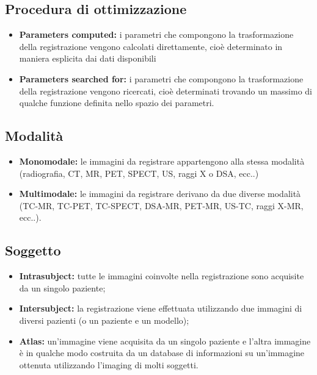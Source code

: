 \subsection{Procedura di ottimizzazione}

\begin{itemize}
    \item \textbf{Parameters computed:} i parametri che compongono la trasformazione della registrazione vengono calcolati direttamente, cioè determinato in maniera esplicita dai dati
          disponibili
    \item \textbf{Parameters searched for:} i parametri che compongono la trasformazione della registrazione vengono ricercati, cioè
          determinati trovando un massimo di qualche funzione definita nello spazio dei parametri.
\end{itemize}

\subsection{Modalità}

\begin{itemize}
    \item \textbf{Monomodale: }le immagini da registrare appartengono alla
          stessa modalità (radiografia, CT, MR, PET, SPECT, US,
          raggi X o DSA, ecc..)
    \item \textbf{Multimodale: }le immagini da registrare derivano da due
          diverse modalità (TC-MR, TC-PET, TC-SPECT, DSA-MR,
          PET-MR, US-TC, raggi X-MR, ecc..).
\end{itemize}

\subsection{Soggetto}

\begin{itemize}
    \item \textbf{Intrasubject: }tutte le immagini coinvolte nella registrazione
          sono acquisite da un singolo paziente;
    \item \textbf{Intersubject: }la registrazione viene effettuata utilizzando due
          immagini di diversi pazienti (o un paziente e un modello);
    \item \textbf{Atlas:} un'immagine viene acquisita da un singolo paziente e
          l'altra immagine è in qualche modo costruita da un database
          di informazioni su un'immagine ottenuta utilizzando l'imaging
          di molti soggetti.
\end{itemize}

